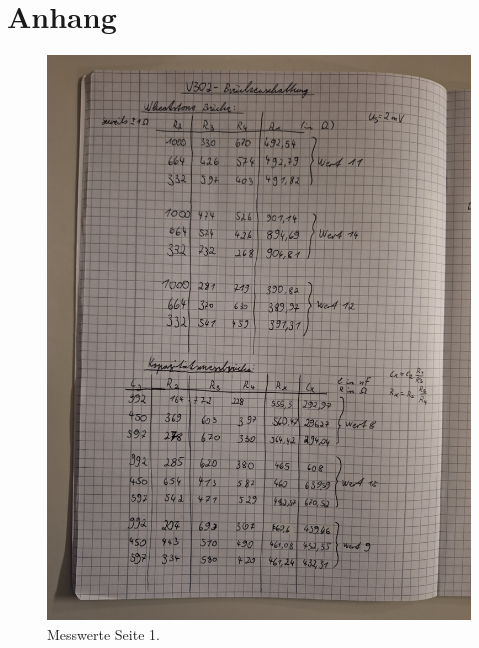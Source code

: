 \section{Anhang}
\label{sec:Anhang}

\begin{figure}
    \caption{Messwerte Seite 1.}
    \centering
    \includegraphics[width=\textwidth, angle=-90]{"Bilder/S1.jpg"}
\end{figure}

